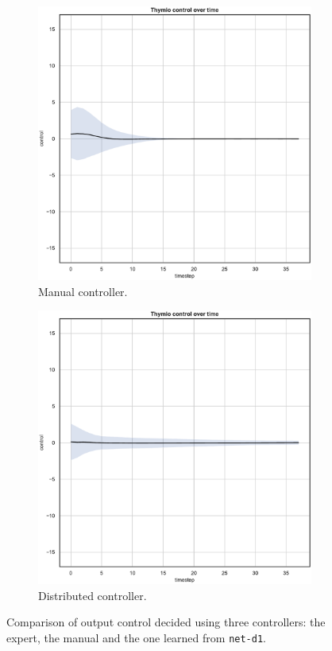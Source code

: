 \begin{figure}[!htb]
\begin{subfigure}[h]{0.3\textwidth}
		\includegraphics[width=\textwidth]{contents/images/net-d1/control-overtime-manual}%
		\caption{Manual controller.}
	\end{subfigure}
	\hfill
	\begin{subfigure}[h]{0.3\textwidth}
		\centering
		\includegraphics[width=\textwidth]{contents/images/net-d1/control-overtime-learned_distributed}
		\caption{Distributed controller.}
	\end{subfigure}
	\caption[Evaluation of the control learned by \texttt{net-d1}.]{Comparison 
		of output control decided using three controllers: the expert, the manual 
		and the one learned from \texttt{net-d1}.}
	\label{fig:net-d1control}
\end{figure}

